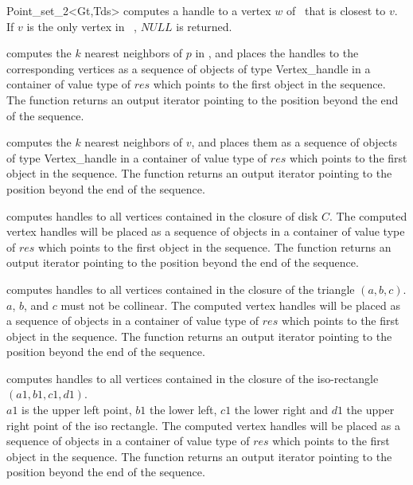 \begin{ccRefClass}{Point_set_2<Gt,Tds>}
{ computes a handle to a vertex $w$ of \ccVar\ that is closest to $v$.
If $v$ is the only vertex in \ccVar\ , $NULL$ is returned.
}

{ computes the $k$ nearest neighbors of $p$ in \ccVar, and places the
handles to the corresponding vertices as a sequence of objects of type
Vertex\_handle in a container of value type of $res$
which points to the first object in the sequence. The function
returns an output iterator pointing to the position beyond the end
of the sequence. }

{ computes the $k$ nearest neighbors of $v$, and places them as a sequence of objects of type
Vertex\_handle in a container of value type of $res$
which points to the first object in the sequence. The function
returns an output iterator pointing to the position beyond the end
of the sequence. }

{ computes handles to all vertices contained in the closure of disk $C$.
The computed vertex handles will be placed as a sequence of objects in a container of value type
of $res$
which points to the first object in the sequence. The function
returns an output iterator pointing to the position beyond the end
of the sequence.
}

{ computes handles to all vertices contained in the closure of the triangle $(a,b,c)$.\\
\ccPrecond $a$, $b$, and $c$ must not be collinear. 
The computed vertex handles will be placed as a sequence of objects in a container of value type
of $res$
which points to the first object in the sequence. The function
returns an output iterator pointing to the position beyond the end
of the sequence.
}

{ computes handles to all vertices contained in the closure of the iso-rectangle $(a1,b1,c1,d1)$.\\
\ccPrecond $a1$ is the upper left point, $b1$ the lower left, $c1$ the lower
right and $d1$ the upper right point of the iso rectangle.
The computed vertex handles will be placed as a sequence of objects in a container of value type
of $res$
which points to the first object in the sequence. The function
returns an output iterator pointing to the position beyond the end
of the sequence.
}


\ccHtmlLinksOn

\end{ccRefClass} 
